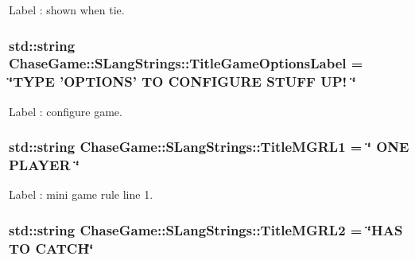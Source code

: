 Label \-: shown when tie. 

\hypertarget{struct_chase_game_1_1_s_lang_strings_acf93994343367490b65893186e3d37eb}{
\subsubsection[{Title\-Game\-Options\-Label}]{\setlength{\rightskip}{0pt plus 5cm}std\-::string Chase\-Game\-::\-S\-Lang\-Strings\-::\-Title\-Game\-Options\-Label = \char`\"{}T\-Y\-P\-E 'O\-P\-T\-I\-O\-N\-S' T\-O C\-O\-N\-F\-I\-G\-U\-R\-E S\-T\-U\-F\-F U\-P! \char`\"{}}}\label{struct_chase_game_1_1_s_lang_strings_acf93994343367490b65893186e3d37eb}


Label \-: configure game. 

\hypertarget{struct_chase_game_1_1_s_lang_strings_abdd2628446dc68073ab903fa6516747c}{
\subsubsection[{Title\-M\-G\-R\-L1}]{\setlength{\rightskip}{0pt plus 5cm}std\-::string Chase\-Game\-::\-S\-Lang\-Strings\-::\-Title\-M\-G\-R\-L1 = \char`\"{} O\-N\-E P\-L\-A\-Y\-E\-R \char`\"{}}}\label{struct_chase_game_1_1_s_lang_strings_abdd2628446dc68073ab903fa6516747c}


Label \-: mini game rule line 1. 

\hypertarget{struct_chase_game_1_1_s_lang_strings_a0067f97060a17ea45752765221a80a7b}{
\subsubsection[{Title\-M\-G\-R\-L2}]{\setlength{\rightskip}{0pt plus 5cm}std\-::string Chase\-Game\-::\-S\-Lang\-Strings\-::\-Title\-M\-G\-R\-L2 = \char`\"{}H\-A\-S T\-O C\-A\-T\-C\-H\char`\"{}}}\label{struct_chase_game_1_1_s_lang_strings_a0067f97060a17ea45752765221a80a7b}


